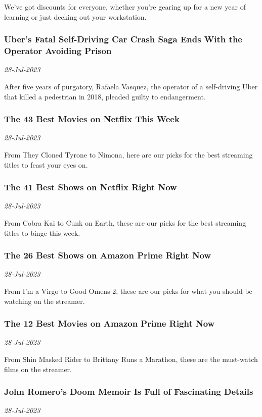 We’ve got discounts for everyone, whether you’re gearing up for a new year of learning or just decking out your workstation.
\subsubsection{Uber's Fatal Self-Driving Car Crash Saga Ends With the Operator Avoiding Prison \href{https://www.wired.com/story/ubers-fatal-self-driving-car-crash-saga-over-operator-avoids-prison/}{}}
\textit{28-Jul-2023}

After five years of purgatory, Rafaela Vasquez, the operator of a self-driving Uber that killed a pedestrian in 2018, pleaded guilty to endangerment.
\subsubsection{The 43 Best Movies on Netflix This Week \href{https://www.wired.com/story/netflix-best-movies-this-week/}{}}
\textit{28-Jul-2023}

From They Cloned Tyrone to Nimona, here are our picks for the best streaming titles to feast your eyes on.
\subsubsection{The 41 Best Shows on Netflix Right Now \href{https://www.wired.com/story/netflix-best-shows-this-week/}{}}
\textit{28-Jul-2023}

From Cobra Kai to Cunk on Earth, these are our picks for the best streaming titles to binge this week.
\subsubsection{The 26 Best Shows on Amazon Prime Right Now \href{https://www.wired.com/story/best-shows-amazon-prime/}{}}
\textit{28-Jul-2023}

From I'm a Virgo to Good Omens 2, these are our picks for what you should be watching on the streamer.
\subsubsection{The 12 Best Movies on Amazon Prime Right Now \href{https://www.wired.com/story/best-amazon-prime-movies/}{}}
\textit{28-Jul-2023}

From Shin Masked Rider to Brittany Runs a Marathon, these are the must-watch films on the streamer.
\subsubsection{John Romero's Doom Memoir Is Full of Fascinating Details \href{https://www.wired.com/2023/07/geeks-guide-john-romero/}{}}
\textit{28-Jul-2023}

